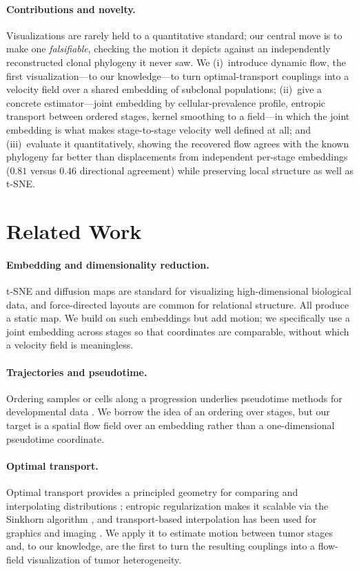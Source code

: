 \documentclass{article}
\begin{document}
\paragraph{Contributions and novelty.} Visualizations are rarely held to a
quantitative standard; our central move is to make one \emph{falsifiable}, checking the
motion it depicts against an independently reconstructed clonal phylogeny it never saw.
We (i)~introduce dynamic flow, the first visualization---to our knowledge---to turn
optimal-transport couplings into a velocity field over a shared embedding of subclonal
populations; (ii)~give a concrete estimator---joint embedding by cellular-prevalence
profile, entropic transport between ordered stages, kernel smoothing to a field---in
which the joint embedding is what makes stage-to-stage velocity well defined at all;
and (iii)~evaluate it quantitatively, showing the recovered flow agrees with the known
phylogeny far better than displacements from independent per-stage embeddings
($0.81$ versus $0.46$ directional agreement) while preserving local structure as well
as t-SNE.

\section{Related Work}

\paragraph{Embedding and dimensionality reduction.} t-SNE \citep{Maaten2008} and
diffusion maps \citep{Coifman2006} are standard for visualizing high-dimensional
biological data, and force-directed layouts \citep{Fruchterman1991} are common for
relational structure. All produce a static map. We build on such embeddings but add
motion; we specifically use a joint embedding across stages so that coordinates are
comparable, without which a velocity field is meaningless.

\paragraph{Trajectories and pseudotime.} Ordering samples or cells along a progression
underlies pseudotime methods for developmental data \citep{Trapnell2014}. We borrow the
idea of an ordering over stages, but our target is a spatial flow field over an
embedding rather than a one-dimensional pseudotime coordinate.

\paragraph{Optimal transport.} Optimal transport provides a principled geometry for
comparing and interpolating distributions \citep{Villani2009}; entropic regularization
makes it scalable via the Sinkhorn algorithm \citep{Cuturi2013}, and transport-based
interpolation has been used for graphics and imaging
\citep{Solomon2015,Bonneel2011}. We apply it to estimate motion between tumor stages
and, to our knowledge, are the first to turn the resulting couplings into a flow-field
visualization of tumor heterogeneity.
\end{document}
